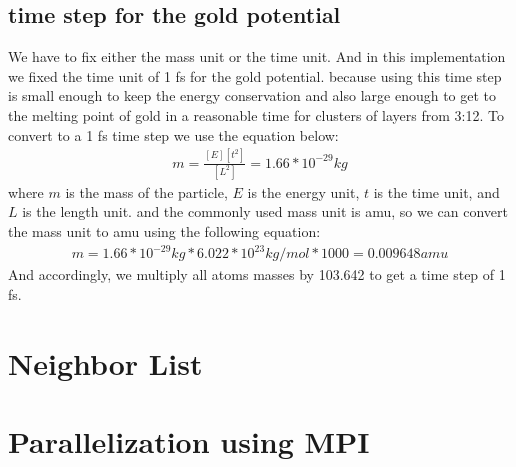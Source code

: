     \subsection{time step for the gold potential}
    We have to fix either the mass unit or the time unit. And in this implementation we fixed the time unit of 1 fs for the gold potential. because using this time step is small enough to keep the energy conservation and also large enough to get to the melting point of gold in a reasonable time for clusters of layers from 3:12. To convert to a 1 fs time step we use the equation below: 
    \begin{equation}
    \label{eq:time_step}
        \begin{aligned}
            m = \frac{[E][t^2]}{[L^2]} = 1.66*10^{-29} kg
        \end{aligned}
    \end{equation}
    where $m$ is the mass of the particle, $E$ is the energy unit, $t$ is the time unit, and $L$ is the length unit.
    and the commonly used mass unit is amu, so we can convert the mass unit to amu using the following equation:
    \begin{equation}
    \label{eq:amu}
        \begin{aligned}
            m = 1.66*10^{-29} kg * 6.022*10^{23} kg/mol * 1000 = 0.009648 amu
        \end{aligned}
    \end{equation}
    And accordingly, we multiply all atoms masses by 103.642 to get a time step of 1 fs.

\section{Neighbor List}

\section{Parallelization using MPI}
